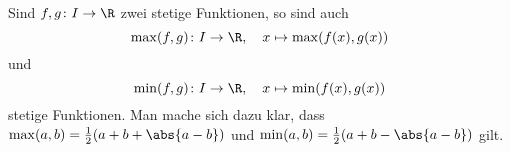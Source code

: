 \begin{exercise}
  Sind $f, g \colon I \to \R$ zwei stetige Funktionen, so sind auch
  \begin{equation*}
    \max(f, g) \colon I \to \R, \quad x \mapsto \max(f(x), g(x))
  \end{equation*}
  und
  \begin{equation*}
    \min(f, g) \colon I \to \R, \quad x \mapsto \min(f(x), g(x))
  \end{equation*}
  stetige Funktionen. Man mache sich dazu klar, dass
  $\max(a, b) = \frac{1}{2} (a + b + \abs{a - b})$ und
  $\min(a, b) = \frac{1}{2}(a + b - \abs{a - b})$ gilt.
\end{exercise}
